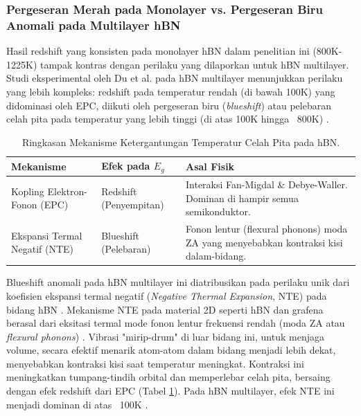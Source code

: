 \subsubsection{Pergeseran Merah pada Monolayer vs. Pergeseran Biru Anomali pada Multilayer hBN}
Hasil redshift yang konsisten pada monolayer hBN dalam penelitian ini (800K-1225K) tampak kontras dengan perilaku yang dilaporkan untuk hBN multilayer. Studi eksperimental oleh Du et al. pada hBN multilayer menunjukkan perilaku yang lebih kompleks: redshift pada temperatur rendah (di bawah 100K) yang didominasi oleh EPC, diikuti oleh pergeseran biru (\textit{blueshift}) atau pelebaran celah pita pada temperatur yang lebih tinggi (di atas 100K hingga ~800K) \citep{Du2017}.

\begin{table}[h!]
  \centering
  \caption{Ringkasan Mekanisme Ketergantungan Temperatur Celah Pita pada hBN.}
  \label{tab:mekanisme_eg_temp}
  \begin{tabular}{p{} p{} p{}}
    \toprule
    \textbf{Mekanisme} & \textbf{Efek pada $E_g$} & \textbf{Asal Fisik} \\
    \midrule
    Kopling Elektron-Fonon (EPC) & Redshift (Penyempitan) & Interaksi Fan-Migdal \& Debye-Waller. Dominan di hampir semua semikonduktor. \\
    \addlinespace
    Ekspansi Termal Negatif (NTE) & Blueshift (Pelebaran) & Fonon lentur (flexural phonons) moda ZA yang menyebabkan kontraksi kisi dalam-bidang. \\
    \bottomrule
  \end{tabular}
\end{table}

Blueshift anomali pada hBN multilayer ini diatribusikan pada perilaku unik dari koefisien ekspansi termal negatif (\textit{Negative Thermal Expansion}, NTE) pada bidang hBN \citep{Du2017}. Mekanisme NTE pada material 2D seperti hBN dan grafena berasal dari eksitasi termal mode fonon lentur frekuensi rendah (moda ZA atau \textit{flexural phonons}) \citep{Sarikurt2022}. Vibrasi "mirip-drum" di luar bidang ini, untuk menjaga volume, secara efektif menarik atom-atom dalam bidang menjadi lebih dekat, menyebabkan kontraksi kisi saat temperatur meningkat. Kontraksi ini meningkatkan tumpang-tindih orbital dan memperlebar celah pita, bersaing dengan efek redshift dari EPC (Tabel \ref{tab:mekanisme_eg_temp}). Pada hBN multilayer, efek NTE ini menjadi dominan di atas ~100K \citep{Du2017}.

